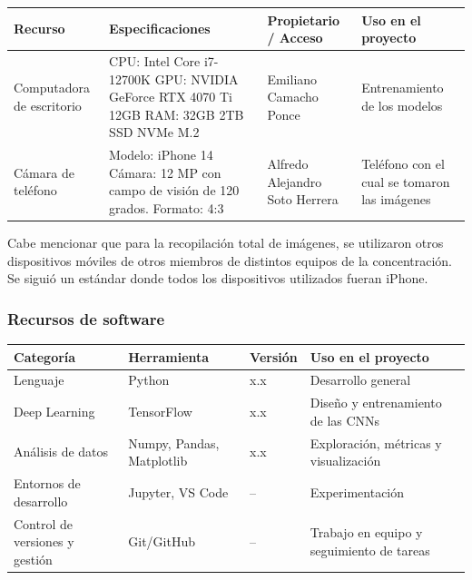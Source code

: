 \noindent
\begin{tabularx}{\textwidth}{>{\raggedright\arraybackslash}p{}>{\raggedright\arraybackslash}X>{\raggedright\arraybackslash}p{}>{\raggedright\arraybackslash}p{}}
  \toprule
  Recurso & Especificaciones & Propietario / Acceso & Uso en el proyecto \\
  \midrule
  Computadora de escritorio & CPU: Intel Core i7-12700K \newline GPU: NVIDIA GeForce RTX 4070 Ti 12GB \newline RAM: 32GB \newline 2TB SSD NVMe M.2 & Emiliano Camacho Ponce & Entrenamiento de los modelos \\
  \addlinespace
  Cámara de teléfono & Modelo: iPhone 14 \newline Cámara: 12 MP con campo de visión de 120 grados. \newline Formato: 4:3 & Alfredo Alejandro Soto Herrera & Teléfono con el cual se tomaron las imágenes \\
  \bottomrule
\end{tabularx}

\medskip
Cabe mencionar que para la recopilación total de imágenes, se utilizaron otros dispositivos móviles de otros miembros de distintos equipos de la concentración. Se siguió un estándar donde todos los dispositivos utilizados fueran iPhone.

\subsubsection{Recursos de software}

\noindent
\begin{tabularx}{\textwidth}{>{\raggedright\arraybackslash}p{}>{\raggedright\arraybackslash}X>{\raggedright\arraybackslash}p{}>{\raggedright\arraybackslash}X}
  \toprule
  Categoría & Herramienta & Versión & Uso en el proyecto \\
  \midrule
  Lenguaje & Python & x.x & Desarrollo general \\
  \addlinespace
  Deep Learning & TensorFlow & x.x & Diseño y entrenamiento de las CNNs \\
  \addlinespace
  Análisis de datos & Numpy, Pandas, Matplotlib & x.x & Exploración, métricas y visualización \\
  \addlinespace
  Entornos de desarrollo & Jupyter, VS Code & -- & Experimentación \\
  \addlinespace
  Control de versiones y gestión & Git/GitHub & -- & Trabajo en equipo y seguimiento de tareas \\
  \bottomrule
\end{tabularx}
